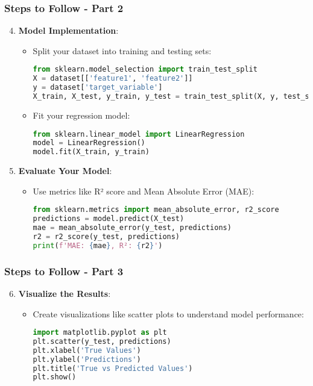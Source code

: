 \documentclass[aspectratio=169]{beamer}
\begin{document}
\begin{frame}[fragile]
    \frametitle{Steps to Follow - Part 2}

    \begin{enumerate}
        \setcounter{enumi}{3}
        \item \textbf{Model Implementation}:
            \begin{itemize}
                \item Split your dataset into training and testing sets:
                \begin{lstlisting}[language=Python]
from sklearn.model_selection import train_test_split
X = dataset[['feature1', 'feature2']]
y = dataset['target_variable']
X_train, X_test, y_train, y_test = train_test_split(X, y, test_size=0.2, random_state=42)
                \end{lstlisting}
                \item Fit your regression model:
                \begin{lstlisting}[language=Python]
from sklearn.linear_model import LinearRegression
model = LinearRegression()
model.fit(X_train, y_train)
                \end{lstlisting}
            \end{itemize}
        
        \item \textbf{Evaluate Your Model}:
            \begin{itemize}
                \item Use metrics like R² score and Mean Absolute Error (MAE):
                \begin{lstlisting}[language=Python]
from sklearn.metrics import mean_absolute_error, r2_score
predictions = model.predict(X_test)
mae = mean_absolute_error(y_test, predictions)
r2 = r2_score(y_test, predictions)
print(f'MAE: {mae}, R²: {r2}')
                \end{lstlisting}
            \end{itemize}
    \end{enumerate}
\end{frame}

\begin{frame}[fragile]
    \frametitle{Steps to Follow - Part 3}

    \begin{enumerate}
        \setcounter{enumi}{5}
        \item \textbf{Visualize the Results}:
            \begin{itemize}
                \item Create visualizations like scatter plots to understand model performance:
                \begin{lstlisting}[language=Python]
import matplotlib.pyplot as plt
plt.scatter(y_test, predictions)
plt.xlabel('True Values')
plt.ylabel('Predictions')
plt.title('True vs Predicted Values')
plt.show()
                \end{lstlisting}
            \end{itemize}
    \end{enumerate}
\end{frame}
\end{document}
